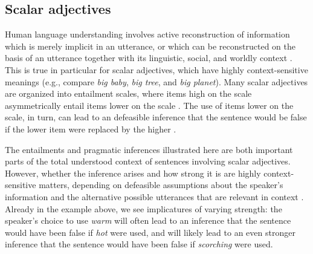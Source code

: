 \documentclass[10pt]{article}
\begin{document}
\subsection{Scalar adjectives}
Human language understanding involves active reconstruction of information which is merely implicit in an utterance, or which can be reconstructed on the basis of an utterance together with its linguistic, social, and worldly context \cite{grice1975logic,hobbs1993interpretation,clark1996using,hanna2003effects,piantadosi2012communicative}.
%
%
%
This is true in particular for scalar adjectives, which have highly context-sensitive meanings (e.g., compare \emph{big baby}, \emph{big tree}, and \emph{big planet}). Many scalar adjectives are organized into entailment scales, where items high on the scale asymmetrically entail items lower on the scale \cite{horn89,horn2000pick}. The use of items lower on the scale, in turn, can lead to an defeasible inference that the sentence would be false if the lower item were replaced by the higher \cite{grice1975logic,horn89}. 

The entailments and pragmatic inferences illustrated here are both important parts of the total understood context of sentences involving scalar adjectives. However, whether the inference arises and how strong it is are highly context-sensitive matters, depending on defeasible assumptions about the speaker's information and the alternative possible utterances that are relevant in context \cite{hirschberg1991theory,frank2012predicting,goodman2013knowledge}. Already in the example above, we see implicatures of varying strength: the speaker's choice to use \emph{warm} will often lead to an inference that the sentence would have been false if \emph{hot} were used, and will likely lead to an even stronger inference that the sentence would have been false if \emph{scorching} were used. 
\end{document}

